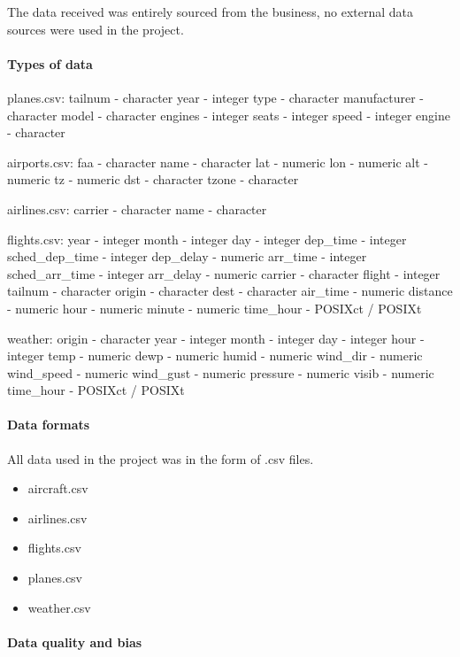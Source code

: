 \documentclass[
]{article}
\providecommand{\tightlist}{%
  \setlength{\itemsep}{0pt}\setlength{\parskip}{0pt}}
\begin{document}
The data received was entirely sourced from the business, no external
data sources were used in the project.

\hypertarget{types-of-data}{%
\paragraph{Types of data}\label{types-of-data}}

planes.csv: tailnum - character year - integer type - character
manufacturer - character model - character engines - integer seats -
integer speed - integer engine - character

airports.csv: faa - character name - character lat - numeric lon -
numeric alt - numeric tz - numeric dst - character tzone - character

airlines.csv: carrier - character name - character

flights.csv: year - integer month - integer day - integer dep\_time -
integer sched\_dep\_time - integer dep\_delay - numeric arr\_time -
integer sched\_arr\_time - integer arr\_delay - numeric carrier -
character flight - integer tailnum - character origin - character dest -
character air\_time - numeric distance - numeric hour - numeric minute -
numeric time\_hour - POSIXct / POSIXt

weather: origin - character year - integer month - integer day - integer
hour - integer temp - numeric dewp - numeric humid - numeric wind\_dir -
numeric wind\_speed - numeric wind\_gust - numeric pressure - numeric
visib - numeric time\_hour - POSIXct / POSIXt

\hypertarget{data-formats}{%
\paragraph{Data formats}\label{data-formats}}

All data used in the project was in the form of .csv files.

\begin{itemize}
\tightlist
\item
  aircraft.csv
\item
  airlines.csv
\item
  flights.csv
\item
  planes.csv
\item
  weather.csv
\end{itemize}

\hypertarget{data-quality-and-bias}{%
\paragraph{Data quality and bias}\label{data-quality-and-bias}}
\end{document}
